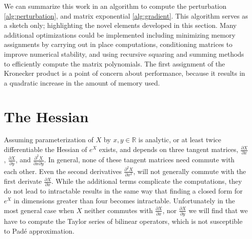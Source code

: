 We can summarize this work in an algorithm to compute the perturbation \ref{alg:perturbation},
and matrix exponential \ref{alg:gradient}. This algorithm serves as a sketch only; 
highlighting the novel elements developed in this section. Many additional optimizations 
could be implemented including minimizing memory assignments by carrying out in place 
computations, conditioning matrices to improve numerical stability, and using recursive 
squaring and summing methods to efficiently compute the matrix polynomials. The first 
assignment of the Kronecker product is a point of concern about performance, because it 
results in a quadratic increase in the amount of memory used. 
\section{The Hessian}
Assuming parameterization of $X$ by $x,y \in \mathbb{R}$ is analytic, or at least twice 
differentiable the Hessian of $e^X$ exists, and depends on three tangent matrices, $\frac{\partial X}{\partial x}$,
$\frac{\partial X}{\partial y}$, and $\frac{\partial^2 X}{\partial x \partial y}$. In 
general, none of these tangent matrices need commute with each other. Even the second 
derivatives $\frac{\partial^2 X}{\partial x^2}$, will not generally commute with the first 
derivate $\frac{\partial X}{\partial x}$. While the additional terms complicate the 
computations, they do not lead to intractable results in the same way that finding a closed
form for $e^X$ in dimensions greater than four becomes intractable. Unfortunately in the 
most general case when $X$ neither commutes with $\frac{\partial X}{\partial x}$, nor $\frac{\partial X}{\partial y}$ 
we will find that we have to compute the Taylor series of bilinear operators, which is not 
susceptible to Pad\'{e} approximation.

